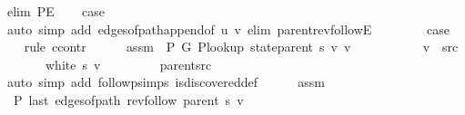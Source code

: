 \begin{isabellebody}
\ {\isacharparenleft}{\kern0pt}elim\ P{\isacharprime}{\kern0pt}E{\isacharparenright}{\kern0pt}\isanewline
\ \ \isamarkupfalse%
\ {\isacharquery}{\kern0pt}case\isanewline
\ \ \ \ \isamarkupfalse%
\ {\isacharparenleft}{\kern0pt}auto\ simp\ add{\isacharcolon}{\kern0pt}\ edges{\isacharunderscore}{\kern0pt}of{\isacharunderscore}{\kern0pt}path{\isacharunderscore}{\kern0pt}append{\isacharunderscore}{\kern0pt}{}{\isacharbrackleft}{\kern0pt}of\ {\isachardoublequoteopen}{\isacharbrackleft}{\kern0pt}u{\isacharcomma}{\kern0pt}\ v{\isacharbrackright}{\kern0pt}{\isachardoublequoteclose}{\isacharbrackright}{\kern0pt}\ elim{\isacharcolon}{\kern0pt}\ parent{\isacharunderscore}{\kern0pt}rev{\isacharunderscore}{\kern0pt}followE{\isacharparenright}{\kern0pt}\isanewline
{}\isamarkupfalse%
\isanewline
\ \ \isamarkupfalse%
\ {}\isanewline
\ \ \isamarkupfalse%
\ {\isacharquery}{\kern0pt}case\isanewline
\ \ \isamarkupfalse%
\ {\isacharparenleft}{\kern0pt}rule\ ccontr{\isacharparenright}{\kern0pt}\isanewline
\ \ \ \ \isamarkupfalse%
\ assm{\isacharcolon}{\kern0pt}\ {\isachardoublequoteopen}{\isasymnot}\ P{\isacharprime}{\kern0pt}\ G{}\ {\isacharparenleft}{\kern0pt}P{\isacharunderscore}{\kern0pt}lookup\ {\isacharparenleft}{\kern0pt}state{\isachardot}{\kern0pt}parent\ s{\isacharparenright}{\kern0pt}\ v{\isacharparenright}{\kern0pt}\ v{\isachardoublequoteclose}\isanewline
\ \ \ \ \isamarkupfalse%
\isanewline
\ \ \ \ \ \ {\isachardoublequoteopen}v\ {\isasymnoteq}\ src{\isachardoublequoteclose}\isanewline
\ \ \ \ \ \ {\isachardoublequoteopen}{\isasymnot}\ white\ s\ v{\isachardoublequoteclose}\isanewline
\ \ \ \ \ \ \isamarkupfalse%
\ {}\ parent{\isacharunderscore}{\kern0pt}src\isanewline
\ \ \ \ \ \ \isamarkupfalse%
\ {\isacharparenleft}{\kern0pt}auto\ simp\ add{\isacharcolon}{\kern0pt}\ follow{\isacharunderscore}{\kern0pt}psimps\ is{\isacharunderscore}{\kern0pt}discovered{\isacharunderscore}{\kern0pt}def{\isacharparenright}{\kern0pt}\isanewline
\ \ \ \ \isamarkupfalse%
\ assm\isanewline
\ \ \ \ \isamarkupfalse%
\ {\isachardoublequoteopen}{\isasymnot}\ P{\isacharprime}{\kern0pt}{\isacharprime}{\kern0pt}\ {\isacharparenleft}{\kern0pt}last\ {\isacharparenleft}{\kern0pt}edges{\isacharunderscore}{\kern0pt}of{\isacharunderscore}{\kern0pt}path\ {\isacharparenleft}{\kern0pt}rev{\isacharunderscore}{\kern0pt}follow\ {\isacharparenleft}{\kern0pt}parent\ s{\isacharparenright}{\kern0pt}\ v{\isacharparenright}{\kern0pt}{\isacharparenright}{\kern0pt}{\isacharparenright}{\kern0pt}{\isachardoublequoteclose}\isanewline

\end{isabellebody}
